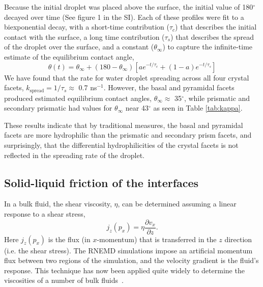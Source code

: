 Because the initial droplet was placed above the surface, the initial
value of 180$^{\circ}$ decayed over time (See figure 1 in the
SI).  Each of these profiles were fit to a
biexponential decay, with a short-time contribution ($\tau_c$) that
describes the initial contact with the surface, a long time
contribution ($\tau_s$) that describes the spread of the droplet over
the surface, and a constant ($\theta_\infty$) to capture the
infinite-time estimate of the equilibrium contact angle,
\begin{equation}
\theta(t) = \theta_\infty +  (180-\theta_\infty) \left[ a e^{-t/\tau_c} +
  (1-a) e^{-t/\tau_s}  \right]
\end{equation}
We have found that the rate for water droplet spreading across all
four crystal facets, $k_\mathrm{spread} = 1/\tau_s \approx$ 0.7
ns$^{-1}$. However, the basal and pyramidal facets produced estimated
equilibrium contact angles, $\theta_\infty \approx$ 35$^{\circ}$, while
prismatic and secondary prismatic had values for $\theta_\infty$ near
43$^{\circ}$ as seen in Table \ref{tab:kappa}.

These results indicate that by traditional measures, the basal and
pyramidal facets are more hydrophilic than the prismatic and secondary
prism facets, and surprisingly, that the differential hydrophilicities
of the crystal facets is not reflected in the spreading rate of the
droplet.


\subsection{Solid-liquid friction of the interfaces}
In a bulk fluid, the shear viscosity, $\eta$, can be determined
assuming a linear response to a shear stress,
\begin{equation}\label{Shenyu-11}
j_{z}(p_{x}) = \eta \frac{\partial v_{x}}{\partial z}.
\end{equation}
Here $j_{z}(p_{x})$ is the flux (in $x$-momentum) that is transferred
in the $z$ direction (i.e. the shear stress). The RNEMD simulations
impose an artificial momentum flux between two regions of the
simulation, and the velocity gradient is the fluid's response. This
technique has now been applied quite widely to determine the
viscosities of a number of bulk fluids~\cite{Muller1999,Bordat2002,Cavalcanti2007}.


